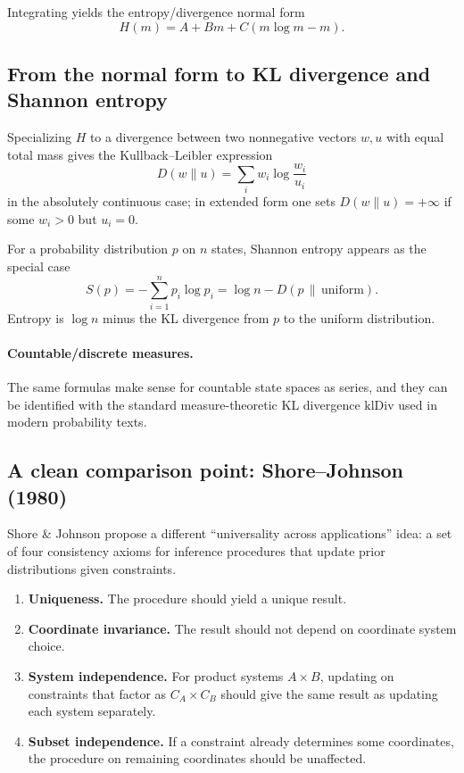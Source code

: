 \documentclass[11pt]{article}
\theoremstyle{definition}
\theoremstyle{remark}
\begin{document}
Integrating yields the entropy/divergence normal form
\[
H(m)=A + Bm + C(m\log m - m).
\]

\subsection{From the normal form to KL divergence and Shannon entropy}

Specializing $H$ to a divergence between two nonnegative vectors $w,u$ with equal total mass gives
the Kullback--Leibler expression
\[
D(w\|u)=\sum_i w_i\log\frac{w_i}{u_i}
\]
in the absolutely continuous case; in extended form one sets $D(w\|u)=+\infty$ if some $w_i>0$ but $u_i=0$.

For a probability distribution $p$ on $n$ states, Shannon entropy appears as the special case
\[
S(p) = -\sum_{i=1}^n p_i\log p_i = \log n - D(p\,\|\,\mathrm{uniform}).
\]
Entropy is $\log n$ minus the KL divergence from $p$ to the uniform distribution.

\paragraph{Countable/discrete measures.}
The same formulas make sense for countable state spaces as series, and they can be identified with the
standard measure-theoretic KL divergence $\mathrm{klDiv}$ used in modern probability texts.

\subsection{A clean comparison point: Shore--Johnson (1980)}

Shore \& Johnson propose a different ``universality across applications'' idea: a set of four
consistency axioms for inference procedures that update prior distributions given constraints.
\begin{enumerate}
  \item \textbf{Uniqueness.} The procedure should yield a unique result.
  \item \textbf{Coordinate invariance.} The result should not depend on coordinate system choice.
  \item \textbf{System independence.} For product systems $A \times B$, updating on constraints that
    factor as $C_A \times C_B$ should give the same result as updating each system separately.
  \item \textbf{Subset independence.} If a constraint already determines some coordinates, the
    procedure on remaining coordinates should be unaffected.
\end{enumerate}
\end{document}
